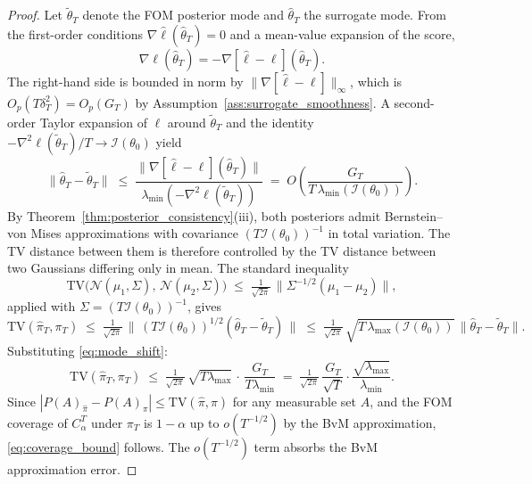 \documentclass[12pt]{article}
\theoremstyle{plain}
\theoremstyle{definition}
\theoremstyle{remark}
\begin{document}
\begin{proof}
Let $\tilde{\theta}_T$ denote the FOM posterior mode and $\hat{\theta}_T$ the surrogate mode. From the first-order conditions $\nabla\hat{\ell}(\hat{\theta}_T) = 0$ and a mean-value expansion of the score,
\[
\nabla \ell(\hat{\theta}_T) = -\nabla[\hat{\ell} - \ell](\hat{\theta}_T).
\]
The right-hand side is bounded in norm by $\|\nabla[\hat{\ell} - \ell]\|_\infty$, which is $O_p(T\delta_T^2)=O_p(G_T)$ by Assumption~\ref{ass:surrogate_smoothness}. A second-order Taylor expansion of $\ell$ around $\tilde{\theta}_T$ and the identity $-\nabla^2\ell(\tilde{\theta}_T)/T \to \mathcal{I}(\theta_0)$ yield
\begin{equation}
\|\hat{\theta}_T - \tilde{\theta}_T\|
  \;\leq\; \frac{\|\nabla[\hat{\ell} - \ell](\hat{\theta}_T)\|}
    {\lambda_{\min}(-\nabla^2\ell(\tilde{\theta}_T))}
  \;=\; O\!\left(\frac{G_T}{T\,\lambda_{\min}(\mathcal{I}(\theta_0))}\right).
\label{eq:mode_shift}
\end{equation}
By Theorem~\ref{thm:posterior_consistency}(iii), both posteriors admit Bernstein--von Mises approximations with covariance $(T\mathcal{I}(\theta_0))^{-1}$ in total variation. The TV distance between them is therefore controlled by the TV distance between two Gaussians differing only in mean. The standard inequality
\[
\text{TV}\!\bigl(\mathcal{N}(\mu_1, \Sigma),\, \mathcal{N}(\mu_2, \Sigma)\bigr)
  \;\leq\; \tfrac{1}{\sqrt{2\pi}}\,\|\Sigma^{-1/2}(\mu_1 - \mu_2)\|,
\]
applied with $\Sigma = (T\mathcal{I}(\theta_0))^{-1}$, gives
\[
\text{TV}(\hat{\pi}_T, \pi_T)
  \;\leq\; \tfrac{1}{\sqrt{2\pi}}\,\|\,(T\mathcal{I}(\theta_0))^{1/2}(\hat{\theta}_T - \tilde{\theta}_T)\,\|
  \;\leq\; \tfrac{1}{\sqrt{2\pi}}\,\sqrt{T\,\lambda_{\max}(\mathcal{I}(\theta_0))}\,\|\hat{\theta}_T - \tilde{\theta}_T\|.
\]
Substituting \eqref{eq:mode_shift}:
\[
\text{TV}(\hat{\pi}_T, \pi_T)
  \;\leq\; \tfrac{1}{\sqrt{2\pi}}\,\sqrt{T\lambda_{\max}}\,\cdot\,\frac{G_T}{T\lambda_{\min}}
  \;=\; \tfrac{1}{\sqrt{2\pi}}\,\frac{G_T}{\sqrt{T}}\cdot\frac{\sqrt{\lambda_{\max}}}{\lambda_{\min}}.
\]
Since $|P(A)_{\hat\pi} - P(A)_\pi| \leq \text{TV}(\hat{\pi}, \pi)$ for any measurable set $A$, and the FOM coverage of $C_\alpha^T$ under $\pi_T$ is $1-\alpha$ up to $o(T^{-1/2})$ by the BvM approximation, \eqref{eq:coverage_bound} follows. The $o(T^{-1/2})$ term absorbs the BvM approximation error.
\end{proof}
\end{document}
